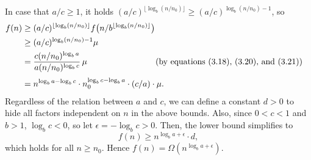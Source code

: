 In case that $a/c\ge1$, it holds $(a/c)^{\lfloor\log_b(n/n_0)\rfloor}\ge(a/c)^{\log_b(n/n_0)-1}$, so
\begin{align*}
    f(n) &\ge (a/c)^{\lfloor\log_b(n/n_0)\rfloor}f\bigl(n/b^{\lfloor\log_b(n/n_0)\rfloor}\bigr) \\
    &\ge (a/c)^{\log_b(n/n_0)-1}\mu \\
    &= \frac{c(n/n_0)^{\log_ba}}{a(n/n_0)^{\log_bc}}\,\mu && \hspace{-2em}\text{(by equations (3.18), (3.20), and (3.21))} \\[1mm]
    &= n^{\log_ba-\log_bc}\cdot n_0^{\log_bc-\log_ba}\cdot(c/a)\cdot\mu.
\end{align*}
Regardless of the relation between $a$ and $c$, we can define a constant $d>0$ to hide all factors independent on $n$ in the above bounds.
Also, since $0<c<1$ and $b>1$, $\log_bc<0$, so let $\epsilon=-\log_bc>0$.
Then, the lower bound simplifies to
\[
    f(n) \ge n^{\log_ba+\epsilon}\cdot d,
\]
which holds for all $n\ge n_0$.
Hence $f(n)=\Omega(n^{\log_ba+\epsilon})$.
